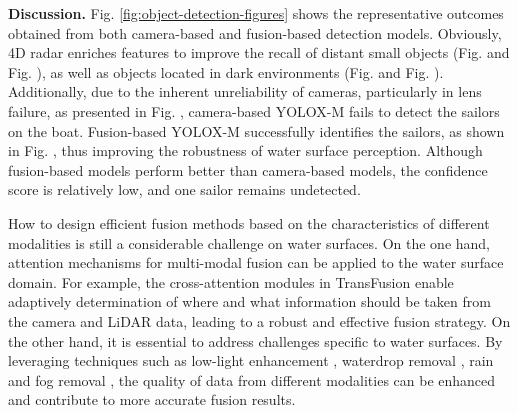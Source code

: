 \documentclass[lettersize,journal]{IEEEtran}
\begin{document}
\textbf{Discussion.} Fig. \ref{fig:object-detection-figures} shows the representative outcomes obtained from both camera-based and fusion-based detection models.
Obviously, 4D radar enriches features to improve the recall of distant small objects (Fig.  and Fig. ), as well as objects located in dark environments (Fig.  and Fig. ). 
Additionally, due to the inherent unreliability of cameras, particularly in lens failure, as presented in Fig. , camera-based YOLOX-M fails to detect the sailors on the boat. Fusion-based YOLOX-M successfully identifies the sailors, as shown in Fig. , thus improving the robustness of water surface perception. 
Although fusion-based models perform better than camera-based models, the confidence score is relatively low, and one sailor remains undetected. 



How to design efficient fusion methods based on the characteristics of different modalities is still a considerable challenge on water surfaces. 
On the one hand, attention mechanisms for multi-modal fusion can be applied to the water surface domain. For example, the cross-attention modules in TransFusion \cite{bai2022transfusion} enable adaptively determination of where and what information should be taken from the camera and LiDAR data, leading to a robust and effective fusion strategy.
On the other hand,  it is essential to address challenges specific to water surfaces. By leveraging techniques such as low-light enhancement \cite{zhou2022lednet}, waterdrop removal \cite{wen2023video}, rain and fog removal \cite{li2020all}, the quality of data from different modalities can be enhanced and contribute to more accurate fusion results.
\end{document}

